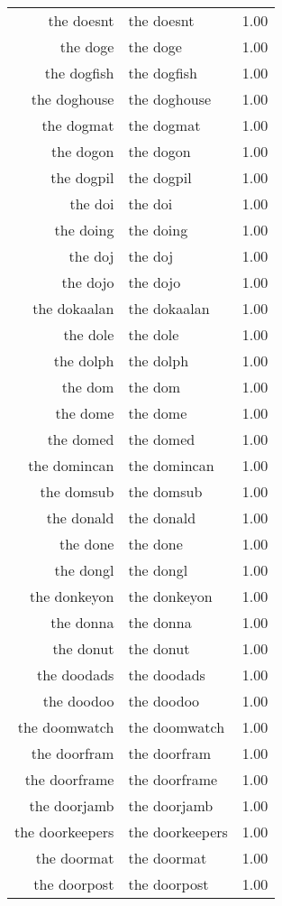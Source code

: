 \begin{table}[ht]
\begin{tabular}{rlr}
  the doesnt & the doesnt & 1.00 \\ 
  the doge & the doge & 1.00 \\ 
  the dogfish & the dogfish & 1.00 \\ 
  the doghouse & the doghouse & 1.00 \\ 
  the dogmat & the dogmat & 1.00 \\ 
  the dogon & the dogon & 1.00 \\ 
  the dogpil & the dogpil & 1.00 \\ 
  the doi & the doi & 1.00 \\ 
  the doing & the doing & 1.00 \\ 
  the doj & the doj & 1.00 \\ 
  the dojo & the dojo & 1.00 \\ 
  the dokaalan & the dokaalan & 1.00 \\ 
  the dole & the dole & 1.00 \\ 
  the dolph & the dolph & 1.00 \\ 
  the dom & the dom & 1.00 \\ 
  the dome & the dome & 1.00 \\ 
  the domed & the domed & 1.00 \\ 
  the domincan & the domincan & 1.00 \\ 
  the domsub & the domsub & 1.00 \\ 
  the donald & the donald & 1.00 \\ 
  the done & the done & 1.00 \\ 
  the dongl & the dongl & 1.00 \\ 
  the donkeyon & the donkeyon & 1.00 \\ 
  the donna & the donna & 1.00 \\ 
  the donut & the donut & 1.00 \\ 
  the doodads & the doodads & 1.00 \\ 
  the doodoo & the doodoo & 1.00 \\ 
  the doomwatch & the doomwatch & 1.00 \\ 
  the doorfram & the doorfram & 1.00 \\ 
  the doorframe & the doorframe & 1.00 \\ 
  the doorjamb & the doorjamb & 1.00 \\ 
  the doorkeepers & the doorkeepers & 1.00 \\ 
  the doormat & the doormat & 1.00 \\ 
  the doorpost & the doorpost & 1.00 \\ 

\end{tabular}
\end{table}
